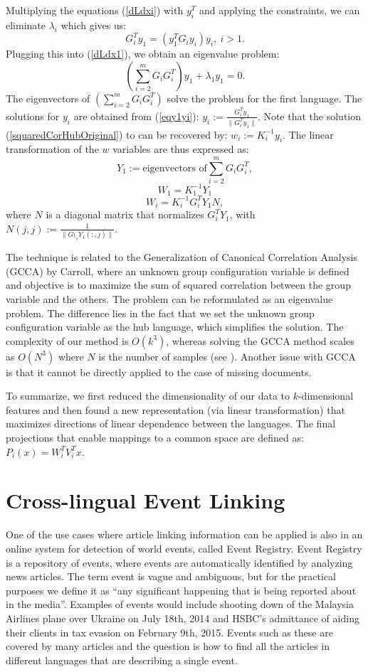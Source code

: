 \documentclass[twoside,11pt]{article}
\begin{document}
Multiplying the equations (\ref{dLdxi}) with $y_i^T$ and applying the constraints, we can eliminate $\lambda_i$ which gives us:
\begin{equation}\label{eqy1yi}
G_{i}^T y_1 = \left(y_1^T G_{i} y_i \right) y_i,~i > 1.
\end{equation}
Plugging this into (\ref{dLdx1}), we obtain an eigenvalue problem:
$$\left( \sum_{i = 2}^m G_i G_{i}^T \right) y_1 + \lambda_1 y_1 = 0.$$
The eigenvectors of $\left( \sum_{i = 2}^m G_i G_{i}^T \right)$ solve the problem for the first language. The solutions for $y_i$ are obtained from (\ref{eqy1yi}): $y_i := \frac{G_{i}^T y_1}{\| G_{i}^T y_1 \|}$.
Note that the solution (\ref{squaredCorHubOriginal}) to can be recovered by: $w_i := K_i^{-1} y_i$. The linear transformation of the $w$ variables are thus expressed as:
$$ Y_1 := \text{eigenvectors of} \sum_{i = 2}^m G_i G_{i}^T, $$
$$ W_1 = K_1^{-1} Y_1 $$
$$ W_i = K_i^{-1} G_{i}^T Y_1 N,$$
where $N$ is a diagonal matrix that normalizes $G_{i}^T Y_1$, with $N(j,j) := \frac{1}{\|G(_{i} Y_1(:,j)\|}$.

 The technique is related to the Generalization of Canonical Correlation Analysis (GCCA) by Carroll\cite{Carroll}, where an unknown group configuration variable is defined and objective is to maximize the sum of squared correlation between the group variable and the others. The problem can be reformulated as an eigenvalue problem. The difference lies in the fact that we set the unknown group configuration variable as the hub language, which simplifies the solution. The complexity of our method is $O(k^3)$, whereas solving the GCCA method scales as $O(N^3)$ where $N$ is the number of samples (see \cite{gifi}). Another issue with GCCA is that it cannot be directly applied to the case of missing documents.

To summarize, we first reduced the dimensionality of our data to $k$-dimensional features and then found a new representation (via linear transformation) that maximizes directions of linear dependence between the languages. The final projections that enable mappings to a common space are defined as: $P_i(x) = W_i^T V_i^T x.$




\section{Cross-lingual Event Linking}

One of the use cases where article linking information can be applied is also in an online system for detection of world events, called Event Registry\cite{}. Event Registry is a repository of events, where events are automatically identified by analyzing news articles. The term event is vague and ambiguous, but for the practical purposes we define it as ``any significant happening that is being reported about in the media''. Examples of events would include shooting down of the Malaysia Airlines plane over Ukraine on July 18th, 2014 and HSBC's admittance of aiding their clients in tax evasion on February 9th, 2015. Events such as these are covered by many articles and the question is how to find all the articles in different languages that are describing a single event.
\end{document}
